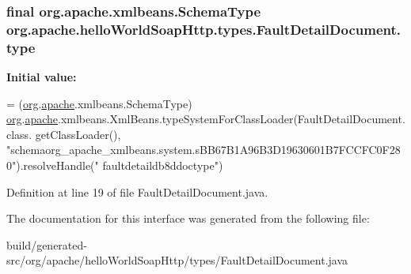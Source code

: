 \subsubsection[{type}]{\setlength{\rightskip}{0pt plus 5cm}final org.\+apache.\+xmlbeans.\+Schema\+Type org.\+apache.\+hello\+World\+Soap\+Http.\+types.\+Fault\+Detail\+Document.\+type\hspace{0.3cm}{\ttfamily [static]}}\label{interfaceorg_1_1apache_1_1hello_world_soap_http_1_1types_1_1_fault_detail_document_ae55abae2e9e45ef48787384af7ff6245}
{\bfseries Initial value\+:}
\begin{DoxyCode}
= (\hyperlink{namespaceorg}{org}.\hyperlink{namespaceorg_1_1apache}{apache}.xmlbeans.SchemaType)
        \hyperlink{namespaceorg}{org}.\hyperlink{namespaceorg_1_1apache}{apache}.xmlbeans.XmlBeans.typeSystemForClassLoader(FaultDetailDocument.class.
      getClassLoader(), \textcolor{stringliteral}{"schemaorg\_apache\_xmlbeans.system.sBB67B1A96B3D19630601B7FCCFC0F280"}).resolveHandle(\textcolor{stringliteral}{"
      faultdetaildb8ddoctype"})
\end{DoxyCode}


Definition at line 19 of file Fault\+Detail\+Document.\+java.



The documentation for this interface was generated from the following file\+:\begin{DoxyCompactItemize}
\item 
build/generated-\/src/org/apache/hello\+World\+Soap\+Http/types/Fault\+Detail\+Document.\+java\end{DoxyCompactItemize}
